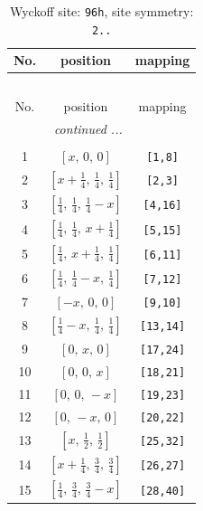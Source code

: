 \documentclass[fleqn,8pt]{jsarticle}
\begin{document}
\begin{longtable}{ccc}
\caption{Wyckoff site: {\tt 96h}, site symmetry: {\tt 2..}}
 \\
 \hline \hline
No. & position & mapping \\ \hline \endfirsthead

\multicolumn{2}{l}{\tablename\ \thetable{}} \\
 \hline \hline
No. & position & mapping \\ \hline \endhead

 \hline \hline
\multicolumn{2}{r}{\footnotesize\it continued ...} \\ \endfoot

 \hline \hline
\multicolumn{2}{r}{} \\ \endlastfoot

1 & $\left[ x,\, 0,\, 0 \right]$ & {\tt [1,8]} \\ \hline
2 & $\left[ x + \frac{1}{4},\, \frac{1}{4},\, \frac{1}{4} \right]$ & {\tt [2,3]} \\ \hline
3 & $\left[ \frac{1}{4},\, \frac{1}{4},\, \frac{1}{4} - x \right]$ & {\tt [4,16]} \\ \hline
4 & $\left[ \frac{1}{4},\, \frac{1}{4},\, x + \frac{1}{4} \right]$ & {\tt [5,15]} \\ \hline
5 & $\left[ \frac{1}{4},\, x + \frac{1}{4},\, \frac{1}{4} \right]$ & {\tt [6,11]} \\ \hline
6 & $\left[ \frac{1}{4},\, \frac{1}{4} - x,\, \frac{1}{4} \right]$ & {\tt [7,12]} \\ \hline
7 & $\left[ - x,\, 0,\, 0 \right]$ & {\tt [9,10]} \\ \hline
8 & $\left[ \frac{1}{4} - x,\, \frac{1}{4},\, \frac{1}{4} \right]$ & {\tt [13,14]} \\ \hline
9 & $\left[ 0,\, x,\, 0 \right]$ & {\tt [17,24]} \\ \hline
10 & $\left[ 0,\, 0,\, x \right]$ & {\tt [18,21]} \\ \hline
11 & $\left[ 0,\, 0,\, - x \right]$ & {\tt [19,23]} \\ \hline
12 & $\left[ 0,\, - x,\, 0 \right]$ & {\tt [20,22]} \\ \hline
13 & $\left[ x,\, \frac{1}{2},\, \frac{1}{2} \right]$ & {\tt [25,32]} \\ \hline
14 & $\left[ x + \frac{1}{4},\, \frac{3}{4},\, \frac{3}{4} \right]$ & {\tt [26,27]} \\ \hline
15 & $\left[ \frac{1}{4},\, \frac{3}{4},\, \frac{3}{4} - x \right]$ & {\tt [28,40]} \\ \hline

\end{longtable}
\end{document}

